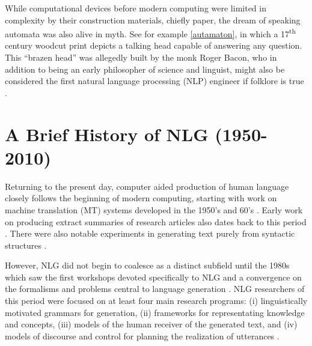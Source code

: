 While computational devices before modern computing were limited in 
complexity by their construction
materials, chiefly paper, the dream of speaking automata was also
alive in myth.
See for example 
\autoref{autamaton}, in which a 17\textsuperscript{th} century woodcut print 
depicts a talking head capable of answering any question. This ``brazen head''
was allegedly built by the monk Roger Bacon, who in addition to being an
early philosopher of science and linguist, might also be considered 
the first natural
language processing (NLP) engineer if folklore is true \citep{sep-roger-bacon}.



\section{A Brief History of NLG (1950-2010)}

Returning to the present day, computer aided 
production of human language closely follows the beginning of modern computing,
starting with work on machine translation (MT) systems developed 
in the 1950's and 60's \citep{ornstein1955mechanical,hutchins2003machine,national1966language}. Early work on producing extract summaries
of research articles also dates back to this period \citep{luhn1958automatic}.
There were also notable experiments in generating text purely from 
syntactic structures \citep{yngve1961random}.

However, NLG did not begin to coalesce as a distinct subfield until the 
1980s which saw
the first workshops devoted specifically to NLG  
and a convergence on the formalisms
and problems central to language generation \citep{reiter1997building,mcdonald2010natural}. 
NLG researchers of this period were focused on at least four
main research programs: (i) linguistically motivated grammars for generation,
(ii) frameworks for representating knowledge and concepts,
(iii) models of the human receiver of the generated text,
and (iv) models of discourse and control for planning the realization
of utterances \citep{mann1981text}. 


